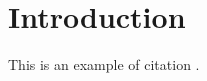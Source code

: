 \section{Introduction} \label{intro:title}

\lipsum[1-3] This is an example of citation \cite{intro_pauli_letter}.
